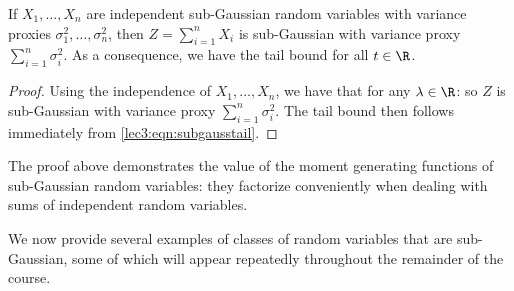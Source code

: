 \begin{theorem}\label{lec3:thm:sum_sub_gaussian}
    If $X_1, \ldots, X_n$ are independent sub-Gaussian random variables with variance proxies $\sigma_1^2, \ldots, \sigma_n^2$, then $Z = \sum_{i = 1}^n X_i$ is sub-Gaussian with variance proxy $\sum_{i = 1}^n \sigma_i^2$. As a consequence, we have the tail bound
    for all $t \in \R$.
\end{theorem}

\begin{proof}
Using the independence of $X_1, \ldots, X_n$, we have that for any $\lambda \in \R$:
 so $Z$ is sub-Gaussian with variance proxy $\sum_{i = 1}^n \sigma_i^2$. The tail bound then follows immediately from \eqref{lec3:eqn:subgausstail}.
\end{proof}

The proof above demonstrates the value of the moment generating functions of sub-Gaussian random variables: they factorize conveniently when dealing with sums of independent random variables.


We now provide several examples of classes of random variables that are sub-Gaussian, some of which will appear repeatedly throughout the remainder of the course.

